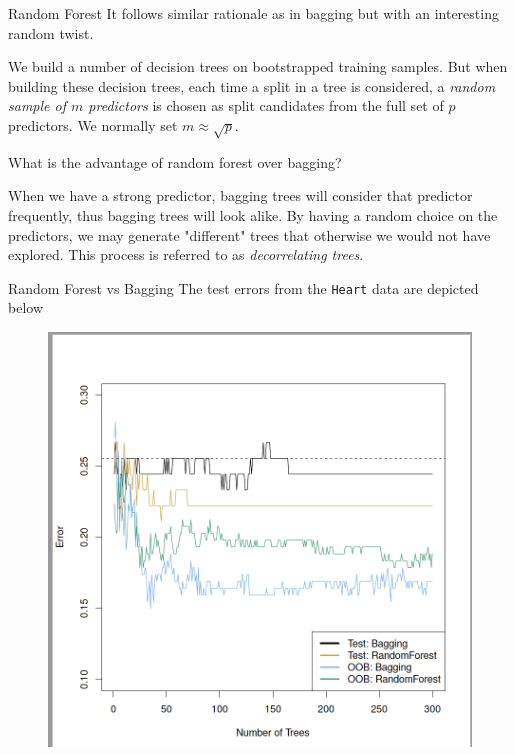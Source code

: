 \documentclass{beamer}
\begin{document}
	\begin{frame}{Random Forest}
		It follows similar rationale as in bagging but with an interesting random twist.
		
		We build a number of decision trees on bootstrapped training samples. But when building these decision trees, each time a split in a tree is considered, a {\it random sample of $m$ predictors} is chosen as split candidates from the full set of $p$ predictors.  We normally set $m\approx \sqrt{p}$.
		
		What is the advantage of random forest over bagging?
		
		When we have a strong predictor, bagging trees will consider that predictor frequently, thus bagging trees will look alike. By having a random choice on the predictors, we may generate "different" trees that otherwise we would not have explored. This process is referred to as {\it decorrelating trees}. 
		
	\end{frame}
	
	\begin{frame}{Random Forest vs Bagging}
		The test errors from the {\tt Heart} data are depicted below
		\begin{figure}[h]
			\centering
			\includegraphics[scale=0.35]{../../Figures/fig_bagging.png}
		\end{figure}
	\end{frame}
	
\end{document}
